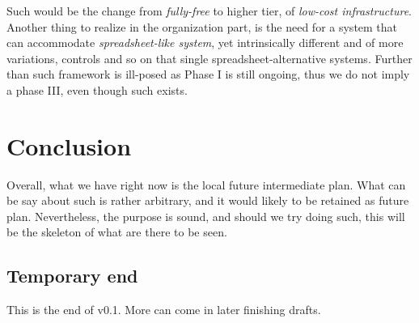 \documentclass[10pt,a4paper]{article}
\begin{document}
Such would be the change from \textit{fully-free} to higher tier, of \textit{low-cost infrastructure}. Another thing to realize in the organization part, is the need for a system that can accommodate \textit{spreadsheet-like system}, yet intrinsically different and of more variations, controls and so on that single spreadsheet-alternative systems. Further than such framework is ill-posed as Phase I is still ongoing, thus we do not imply a phase III, even though such exists. 

\section{Conclusion}

Overall, what we have right now is the local future intermediate plan. What can be say about such is rather arbitrary, and it would likely to be retained as future plan. Nevertheless, the purpose is sound, and should we try doing such, this will be the skeleton of what are there to be seen. 

\subsection{Temporary end}

This is the end of v0.1. More can come in later finishing drafts. 

\end{document}
